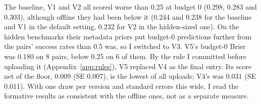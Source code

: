 The baseline, V1 and V2 all scored worse than 0.25 at budget 0 (0.298, 0.283 and 0.303), although offline they had been below it (0.244 and 0.238 for the baseline and V1 in the default setting, 0.232 for V2 in the hidden-sized one). On the hidden benchmarks their metadata priors put budget-0 predictions further from the pairs' success rates than 0.5 was, so I switched to V3. V5's budget-0 Brier was 0.180 on 8 pairs, below 0.25 on 6 of them. By the rule I committed before uploading it (Appendix~\ref{app:rules}), V5 replaced V4 as the final entry. Its score net of the floor, 0.009 (SE 0.007), is the lowest of all uploads; V4's was 0.031 (SE 0.011). With one draw per version and standard errors this wide, I read the formative results as consistent with the offline ones, not as a separate measure.
